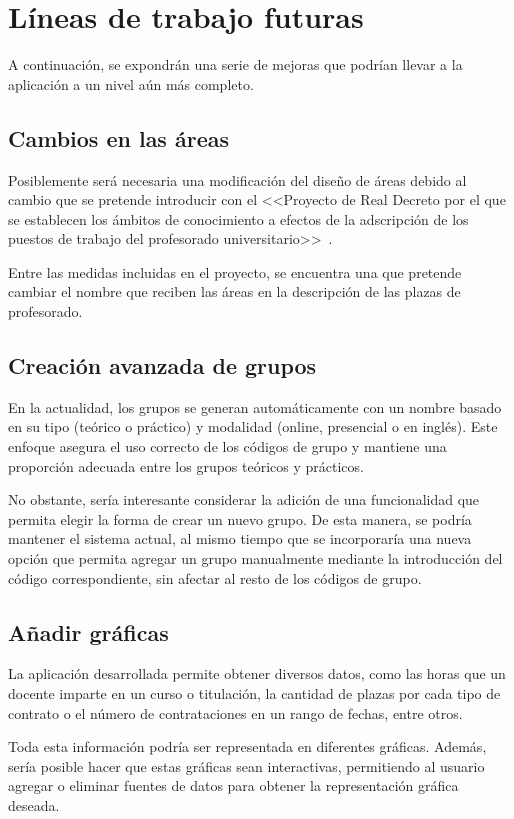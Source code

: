 \section{Líneas de trabajo futuras}
A continuación, se expondrán una serie de mejoras que podrían llevar a la aplicación a un nivel aún más completo.

\subsection{Cambios en las áreas}
Posiblemente será necesaria una modificación del diseño de áreas debido al cambio que se pretende introducir con el <<Proyecto de Real Decreto por el que se establecen los ámbitos de conocimiento a efectos de la adscripción de los puestos de trabajo del profesorado universitario>>~\cite{gob:areas}. 

Entre las medidas incluidas en el proyecto, se encuentra una que pretende cambiar el nombre que reciben las áreas en la descripción de las plazas de profesorado.

\subsection{Creación avanzada de grupos}
En la actualidad, los grupos se generan automáticamente con un nombre basado en su tipo (teórico o práctico) y modalidad (online, presencial o en inglés). Este enfoque asegura el uso correcto de los códigos de grupo y mantiene una proporción adecuada entre los grupos teóricos y prácticos.

No obstante, sería interesante considerar la adición de una funcionalidad que permita elegir la forma de crear un nuevo grupo. De esta manera, se podría mantener el sistema actual, al mismo tiempo que se incorporaría una nueva opción que permita agregar un grupo manualmente mediante la introducción del código correspondiente, sin afectar al resto de los códigos de grupo.

\subsection{Añadir gráficas}
La aplicación desarrollada permite obtener diversos datos, como las horas que un docente imparte en un curso o titulación, la cantidad de plazas por cada tipo de contrato o el número de contrataciones en un rango de fechas, entre otros.

Toda esta información podría ser representada en diferentes gráficas. Además, sería posible hacer que estas gráficas sean interactivas, permitiendo al usuario agregar o eliminar fuentes de datos para obtener la representación gráfica deseada.

